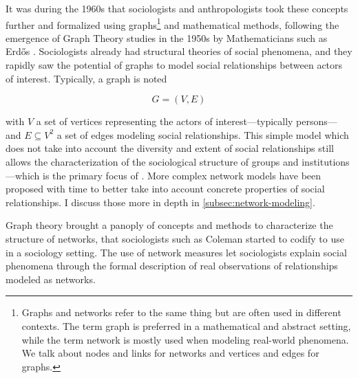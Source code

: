 It was during the 1960s that sociologists and anthropologists took these concepts further and formalized \sna using graphs\footnote{Graphs and networks refer to the same thing but are often used in different contexts. The term graph is preferred in a mathematical and abstract setting, while the term network is mostly used when modeling real-world phenomena. We talk about nodes and links for networks and vertices and edges for graphs.} and mathematical methods\cite{cConceptUseSocial1969, freemanDevelopmentSocialNetwork2004}, following the emergence of Graph Theory studies in the 1950s by Mathematicians such as Erd\H{o}s \cite{erdos2011}.
Sociologists already had structural theories of social phenomena, and they rapidly saw the potential of graphs to model social relationships between actors of interest.
Typically, a graph is noted

\begin{equation}
    G = (V, E)\label{eq:graph}
\end{equation}

with $V$ a set of vertices representing the actors of interest---typically persons---and $E \subseteq V^2$ a set of edges modeling social relationships.
This simple model which does not take into account the diversity and extent of social relationships still allows the characterization of the sociological structure of groups and institutions---which is the primary focus of \sna\cite{scottSocialNetworkAnalysis1988, freemanDevelopmentSocialNetwork2004}.
More complex network models have been proposed with time to better take into account concrete properties of social relationships.
I discuss those more in depth in \autoref{subsec:network-modeling}.


Graph theory brought a panoply of concepts and methods to characterize the structure of  networks, that sociologists such as Coleman started to codify to use in a sociology setting\cite{colemanIntroductionMathematicalSociology1964}.
The use of network measures let sociologists explain social phenomena through the formal description of real observations of relationships modeled as networks. 


